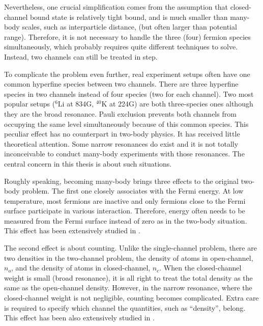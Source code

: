   Nevertheless, one crucial simplification comes from  the assumption that closed-channel bound state is relatively tight bound, and is much smaller than  many-body scales, such as interparticle distance, (but often larger than potential range).  Therefore, it is not necessary to handle the three (four) fermion species simultaneously, which probably requires quite different techniques to solve. Instead, two channels can still be treated in step. 

To complicate the problem even further,  real experiment setups often have one common hyperfine species between two channels. There are three hyperfine species in two channels instead of four species (two for each channel).  Two most popular setups (${}^{6}\text{Li}$ at 834G, $^{40}\text{K}$ at 224G) are both three-species ones although they are the broad resonance.  Pauli exclusion prevents  both channels from occupying the same level simultaneously because of this common species.  This peculiar effect has no counterpart in two-body physics. It has  received little theoretical attention.    Some  narrow resonances do exist \cite{ChinRMP} and it is not totally inconceivable to conduct many-body experiments with those resonances.  The central concern in this thesis is about such situations. 

Roughly speaking, becoming many-body brings three effects to the original two-body problem.  The first one closely associates with the Fermi energy.  At low temperature, most fermions are inactive and only fermions close to the Fermi surface participate in various interaction. Therefore, energy often needs to be measured from the Fermi surface instead of zero as in the two-body situation.  This effect has been extensively studied in \cite{GurarieNarrow}.

The second effect is about counting. Unlike the single-channel problem, there are two densities in the two-channel problem, the density of atoms in open-channel, $n_{o}$, and the density of atoms in closed-channel, $n_{c}$. When the closed-channel weight is small (broad resonance), it is all right to treat the total density as the same as the open-channel density.  However, in the narrow resonance, where the closed-channel weight is not negligible, counting becomes complicated.  Extra care is required to specify which channel the  quantities, such as ``density'', belong.  This effect has been  also extensively studied in \cite{GurarieNarrow}.

